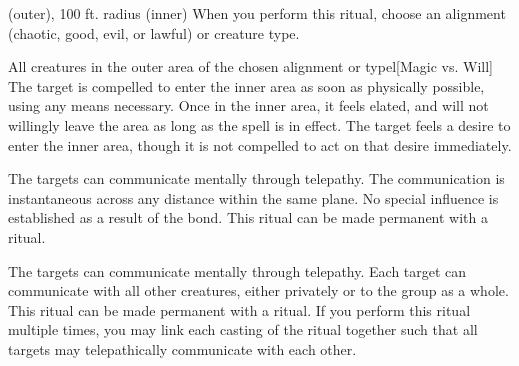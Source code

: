 \spellrng{\rngclose}
 (outer), 100 ft. radius (inner)
\spellspecial When you perform this ritual, choose an alignment (chaotic, good, evil, or lawful) or creature type.
\begin{spelltargets}{All creatures in the outer area of the chosen alignment or type}l[Magic vs. Will]
    \spellsuccess The target is compelled to enter the inner area as soon as physically possible, using any means necessary. Once in the inner area, it feels elated, and will not willingly leave the area as long as the spell is in effect.
    \spellfailure The target feels a desire to enter the inner area, though it is not compelled to act on that desire immediately.
\end{spelltargets}

\spellrng{\rngclose}
\spelldur{\durext \dismissable}
\spellline
\spelleffect The targets can communicate mentally through telepathy. The communication is instantaneous across any distance within the same plane.
\spellnotes No special influence is established as a result of the bond. This ritual can be made permanent with a  ritual.

\spelldur{\durext \dismissable}
\spellline
\spelleffect The targets can communicate mentally through telepathy. Each target can communicate with all other creatures, either privately or to the group as a whole.
\spellnotes This ritual can be made permanent with a  ritual. If you perform this ritual multiple times, you may link each casting of the ritual together such that all targets may telepathically communicate with each other. 

